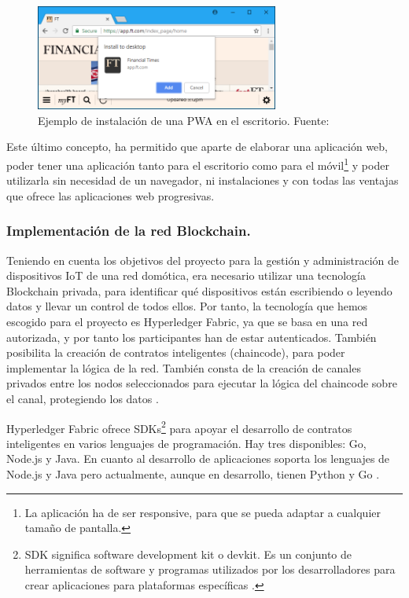 \vspace{5mm}

\begin{figure}[ht!]
    \centering
    \includegraphics[width=8cm]{imagenes/herramientas/pwa-instalacion}
    \caption{Ejemplo de instalación de una PWA en el escritorio. Fuente: \cite{progressive-web-apps}}
    \label{fig:instalacion-pwa}
\end{figure}

\vspace{5mm}

\noindent Este último concepto, ha permitido que aparte de elaborar una aplicación web, poder tener una aplicación 
tanto para el escritorio como para el móvil\footnote{La aplicación ha de ser responsive, para que se pueda adaptar a 
cualquier tamaño de pantalla.\label{fnlabel}} y poder utilizarla sin necesidad de un navegador, ni instalaciones y con 
todas las ventajas que ofrece las aplicaciones web progresivas. 

\subsubsection{Implementación de la red Blockchain.}

Teniendo en cuenta los objetivos del proyecto para la gestión y administración de dispositivos IoT de una red
domótica, era necesario utilizar una tecnología Blockchain privada, para identificar qué dispositivos están
escribiendo o leyendo datos y llevar un control de todos ellos. Por tanto, la tecnología que hemos escogido 
para el proyecto es Hyperledger Fabric, ya que se basa en una red autorizada, y por tanto los participantes
han de estar autenticados. También posibilita la creación de contratos inteligentes (chaincode), para poder 
implementar la lógica de la red. También consta de la creación de canales privados entre los nodos seleccionados 
para ejecutar la lógica del chaincode sobre el canal, protegiendo los datos \cite{why-hyperledger-fabric}.

\vspace{5mm}

\noindent Hyperledger Fabric ofrece SDKs\footnote{SDK significa software development kit o devkit. Es un
conjunto de herramientas de software y programas utilizados por los desarrolladores para crear aplicaciones para 
plataformas específicas \cite{what-is-sdk}.\label{fnlabel}} para apoyar el desarrollo de contratos 
inteligentes en varios lenguajes de programación. Hay tres disponibles: Go, Node.js y Java. En cuanto al desarrollo 
de aplicaciones soporta los lenguajes de Node.js y Java pero actualmente, aunque en desarrollo, tienen Python y Go 
\cite{hyperledger-fabric-docs, hyperledger-fabric-nodejs-sdk}.

